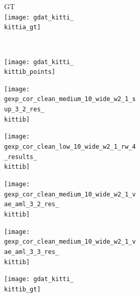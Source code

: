 \begin{figure}[t]
{\begin{subfigure}[t]{0.5\textwidth}
\begin{subfigure}[t]{0.15\textwidth}
			GT\\
			\texttt{[image: gdat\_kitti\_\\kittia\_gt]}
		\end{subfigure}
		\\[-4px]
		\begin{subfigure}[t]{0.15\textwidth}
			\vspace{0px}\centering
			\texttt{[image: gdat\_kitti\_\\kittib\_points]}
		\end{subfigure}
		\begin{subfigure}[t]{0.15\textwidth}
			\vspace{0px}\centering
			\texttt{[image: gexp\_cor\_clean\_medium\_10\_wide\_w2\_1\_sup\_3\_2\_res\_\\kittib]}
		\end{subfigure}
		\begin{subfigure}[t]{0.15\textwidth}
			\vspace{0px}\centering
			\texttt{[image: gexp\_cor\_clean\_low\_10\_wide\_w2\_1\_rw\_4\_results\_\\kittib]}
		\end{subfigure}
		\begin{subfigure}[t]{0.15\textwidth}
			\vspace{0px}\centering
			\texttt{[image: gexp\_cor\_clean\_medium\_10\_wide\_w2\_1\_vae\_aml\_3\_2\_res\_\\kittib]}
		\end{subfigure}
		\begin{subfigure}[t]{0.15\textwidth}
			\vspace{0px}\centering
			\texttt{[image: gexp\_cor\_clean\_medium\_10\_wide\_w2\_1\_vae\_aml\_3\_3\_res\_\\kittib]}
		\end{subfigure}
		\begin{subfigure}[t]{0.15\textwidth}
			\vspace{0px}\centering
			\texttt{[image: gdat\_kitti\_\\kittib\_gt]}
		\end{subfigure}
		\\[-4px]
		\begin{subfigure}[t]{0.15\textwidth}

\end{subfigure}
\end{subfigure}}
\end{figure}
